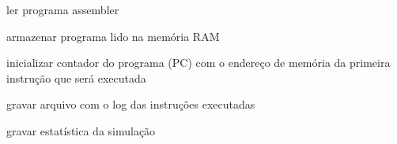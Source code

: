 \begin{algorithm}[ht]
{        \BlankLine

        ler programa assembler

        \BlankLine

        armazenar programa lido na memória RAM

        \BlankLine

        inicializar contador do programa (PC) com o endereço de memória da primeira instrução que será executada

        \BlankLine
        

        \BlankLine

        gravar arquivo com o log das instruções executadas

        \BlankLine

        gravar estatística da simulação

    } 

\end{algorithm}